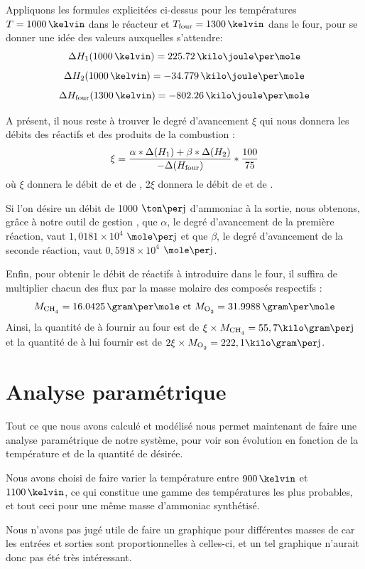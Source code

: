 Appliquons les formules explicitées ci-dessus pour les températures $T=1000\,\kelvin$
dans le réacteur et $T\ind{four} = 1300\,\kelvin$ dans le four,
pour se donner une idée des valeurs auxquelles s'attendre:
$$\Delta H_1 (1000\,\kelvin) = 225.72\,\kilo\joule\per\mole$$
$$\Delta H_2 (1000\,\kelvin) = -34.779\,\kilo\joule\per\mole$$
$$\Delta H\ind{four} (1300\,\kelvin) = -802.26\,\kilo\joule\per\mole$$

A présent, il nous reste à trouver le degré d'avancement $\xi$
qui nous donnera les débits des réactifs et des produits de la combustion :
$$\xi = \frac{\alpha * \Delta (H_1) + \beta * \Delta (H_2)}{-\Delta (H_{\mbox{\scriptsize{four}}})}*\frac{100}{75}$$
où $\xi$ donnera le débit de  et de ,
2$\xi$ donnera le débit de  et de .

Si l'on désire un débit de 1000 $\ton\per\jour$ d'ammoniac à la sortie,  nous obtenons, grâce à notre outil de gestion \matlab, que  $\alpha$, le degré d'avancement de la première réaction, vaut $1,0181\times10^4$ $\mole\per\jour$ et que $\beta$, le degré d'avancement de la seconde réaction, vaut $0,5918\times10^4$ $\mole\per\jour$.

Enfin, pour obtenir le débit de réactifs à introduire dans le four,
il suffira de multiplier chacun des flux par la masse molaire des composés respectifs :
\begin{equation*}
M_{\ce{CH4}}=16.0425\,\gram\per\mole \mbox{ et } M_{\ce{O2}}=31.9988\,\gram\per\mole
\end{equation*}
Ainsi, la quantité de  à fournir au four est de $\xi \times M_{\ce{CH4}} = 55,7  \kilo\gram\per\jour$
\\et la quantité de  à lui fournir est de $2\xi \times M_{\ce{O2}} = 222,1 \kilo\gram\per\jour$.

\section{Analyse paramétrique}

Tout ce que nous avons calculé et modélisé nous permet maintenant de faire une analyse paramétrique de notre système, pour voir son évolution en fonction de la température et de la quantité de  désirée.

Nous avons choisi de faire varier la température entre $900\,\kelvin$ et $1100\,\kelvin$, ce qui constitue une gamme des températures les plus probables, et tout ceci pour une même masse d'ammoniac synthétisé.

Nous n'avons pas jugé utile de faire un graphique pour différentes masses de  car les entrées et sorties sont proportionnelles à celles-ci, et un tel graphique n'aurait donc pas été très intéressant.

